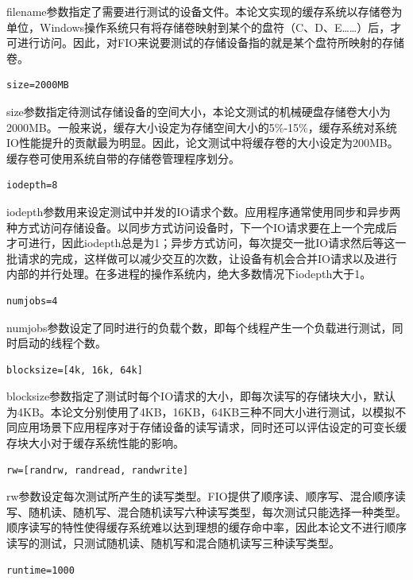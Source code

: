 filename参数指定了需要进行测试的设备文件。本论文实现的缓存系统以存储卷为单位，Windows操作系统只有将存储卷映射到某个的盘符（C、D、E……）后，才可进行访问。因此，对FIO来说要测试的存储设备指的就是某个盘符所映射的存储卷。

\begin{lstlisting}
size=2000MB
\end{lstlisting}

size参数指定待测试存储设备的空间大小，本论文测试的机械硬盘存储卷大小为2000MB。一般来说，缓存大小设定为存储空间大小的5\%-15\%，缓存系统对系统IO性能提升的贡献最为明显。因此，论文测试中将缓存卷的大小设定为200MB。缓存卷可使用系统自带的存储卷管理程序划分。

\begin{lstlisting}
iodepth=8
\end{lstlisting}

iodepth参数用来设定测试中并发的IO请求个数。应用程序通常使用同步和异步两种方式访问存储设备。以同步方式访问设备时，下一个IO请求要在上一个完成后才可进行，因此iodepth总是为1；异步方式访问，每次提交一批IO请求然后等这一批请求的完成，这样做可以减少交互的次数，让设备有机会合并IO请求以及进行内部的并行处理。在多进程的操作系统内，绝大多数情况下iodepth大于1。

\begin{lstlisting}
numjobs=4
\end{lstlisting}

numjobs参数设定了同时进行的负载个数，即每个线程产生一个负载进行测试，同时启动的线程个数。

\begin{lstlisting}
blocksize=[4k, 16k, 64k]
\end{lstlisting}

blocksize参数指定了测试时每个IO请求的大小，即每次读写的存储块大小，默认为4KB。本论文分别使用了4KB，16KB，64KB三种不同大小进行测试，以模拟不同应用场景下应用程序对于存储设备的读写请求，同时还可以评估设定的可变长缓存块大小对于缓存系统性能的影响。

\begin{lstlisting}
rw=[randrw, randread, randwrite]
\end{lstlisting}

rw参数设定每次测试所产生的读写类型。FIO提供了顺序读、顺序写、混合顺序读写、随机读、随机写、混合随机读写六种读写类型，每次测试只能选择一种类型。顺序读写的特性使得缓存系统难以达到理想的缓存命中率，因此本论文不进行顺序读写的测试，只测试随机读、随机写和混合随机读写三种读写类型。

\begin{lstlisting}
runtime=1000
\end{lstlisting}

